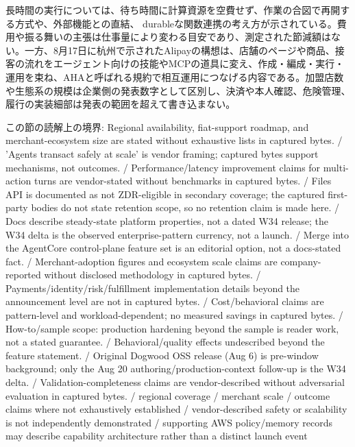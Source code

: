 \noindent 長時間の実行については、待ち時間に計算資源を空費せず、作業の合図で再開する方式や、外部機能との直結、 durableな関数連携の考え方が示されている。費用や振る舞いの主張は仕事量により変わる目安であり、測定された節減額はない。一方、8月17日に杭州で示されたAlipayの構想は、店舗のページや商品、接客の流れをエージェント向けの技能やMCPの道具に変え、作成・編成・実行・運用を束ね、AHAと呼ばれる規約で相互運用につなげる内容である。加盟店数や生態系の規模は企業側の発表数字として区別し、決済や本人確認、危険管理、履行の実装細部は発表の範囲を超えて書き込まない。 \cite{w2026w34w34eventc105,w2026w34w34eventc007}\par\medskip

\begin{claimboundary}[読解上の境界]
この節の読解上の境界: Regional availability, fiat-support roadmap, and merchant-ecosystem size are stated without exhaustive lists in captured bytes. / 'Agents transact safely at scale' is vendor framing; captured bytes support mechanisms, not outcomes. / Performance/latency improvement claims for multi-action turns are vendor-stated without benchmarks in captured bytes. / Files API is documented as not ZDR-eligible in secondary coverage; the captured first-party bodies do not state retention scope, so no retention claim is made here. / Docs describe steady-state platform properties, not a dated W34 release; the W34 delta is the observed enterprise-pattern currency, not a launch. / Merge into the AgentCore control-plane feature set is an editorial option, not a docs-stated fact. / Merchant-adoption figures and ecosystem scale claims are company-reported without disclosed methodology in captured bytes. / Payments/identity/risk/fulfillment implementation details beyond the announcement level are not in captured bytes. / Cost/behavioral claims are pattern-level and workload-dependent; no measured savings in captured bytes. / How-to/sample scope: production hardening beyond the sample is reader work, not a stated guarantee. / Behavioral/quality effects undescribed beyond the feature statement. / Original Dogwood OSS release (Aug 6) is pre-window background; only the Aug 20 authoring/production-context follow-up is the W34 delta. / Validation-completeness claims are vendor-described without adversarial evaluation in captured bytes. / regional coverage / merchant scale / outcome claims where not exhaustively established / vendor-described safety or scalability is not independently demonstrated / supporting AWS policy/memory records may describe capability architecture rather than a distinct launch event
\end{claimboundary}
